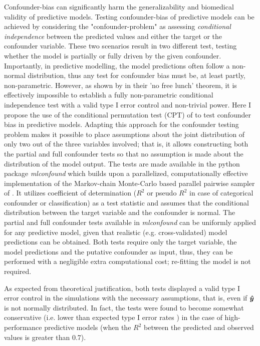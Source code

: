 \documentclass{article}
\begin{document}
Confounder-bias can significantly harm the generalizability and biomedical validity of predictive models. Testing confounder-bias of predictive models can be achieved by considering the "confounder-problem" as assessing \emph{conditional independence} between the predicted values and either the target or the confounder variable. These two scenarios result in two different test, testing whether the model is partially or fully driven by the given confounder.
Importantly, in predictive modelling, the model predictions often follow a non-normal distribution, thus any test for confounder bias must be, at least partly, non-parametric.
However, as shown by \citet{shah2020hardness} in their 'no free lunch' theorem, it is effectively impossible to establish a fully non-parametric conditional independence test with a valid type I error control and non-trivial power.
Here I propose the use of the conditional permutation test (CPT) of \cite{berrett2020conditional} to test confounder bias in predictive models. Adapting this approach for the confounder testing problem makes it possible to place assumptions about the joint distribution of only two out of the three variables involved; that is, it allows constructing both the partial and full confounder tests so that no assumption is made about the distribution of the model output. 
The tests are made available in the python package \emph{mlconfound} which builds upon a parallelized, computationally effective implementation of the Markov-chain Monte-Carlo based parallel pairwise sampler of \cite{berrett2020conditional}. It utilizes coefficient of determination ($R^2$ or pseudo $R^2$ in case of categorical confounder or classification) as a test statistic and assumes that the conditional distribution between the target variable and the confounder is normal. The partial and full confounder tests available in \emph{mlconfound} can be uniformly applied for any predictive model, given that realistic (e.g. cross-validated) model predictions can be obtained. Both tests require only the target variable, the model predictions and the putative confounder as input, thus, they can be performed with a negligible extra computational cost; re-fitting the model is not required.

As expected from theoretical justification, both tests displayed a valid type I error control in the simulations with the necessary assumptions, that is, even if $\boldsymbol{\hat{y}}$ is not normally distributed. In fact, the tests were found to become somewhat conservative (i.e. lower than expected type I error rates ) in the case of high-performance predictive models (when the $R^2$ between the predicted and observed values is greater than 0.7). 
\end{document}
